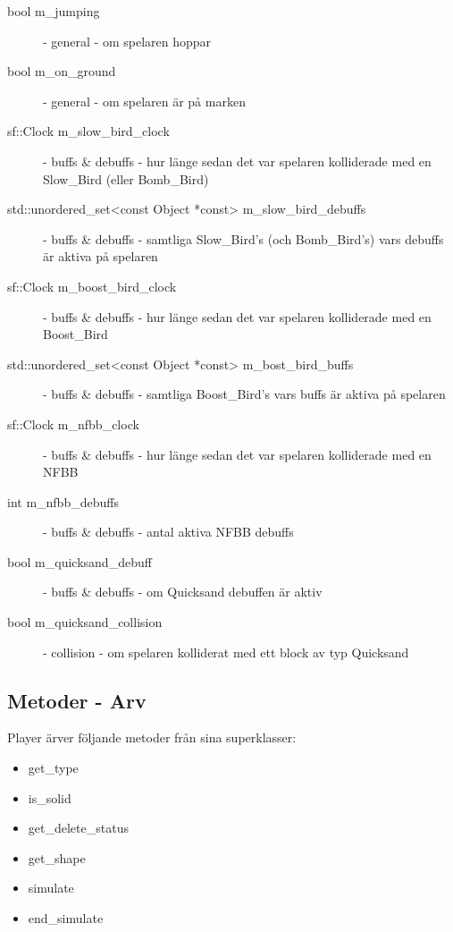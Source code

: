 \documentclass{TDP003mall}
\begin{document}
\begin{description}
\item[bool m\_jumping] - general - om spelaren hoppar
\item[bool m\_on\_ground] - general - om spelaren är på marken
\item[sf::Clock m\_slow\_bird\_clock] - buffs \& debuffs - hur länge sedan det var spelaren kolliderade med en Slow\_Bird (eller Bomb\_Bird)

\item[std::unordered\_set<const Object *const> m\_slow\_bird\_debuffs] - buffs \& debuffs - samtliga Slow\_Bird's (och Bomb\_Bird's) vars debuffs är aktiva på spelaren

\item[sf::Clock m\_boost\_bird\_clock] - buffs \& debuffs - hur länge sedan det var spelaren kolliderade med en Boost\_Bird

\item[std::unordered\_set<const Object *const> m\_bost\_bird\_buffs] - buffs \& debuffs - samtliga Boost\_Bird's vars buffs är aktiva på spelaren

\item[sf::Clock m\_nfbb\_clock] - buffs \& debuffs - hur länge sedan det var spelaren kolliderade med en NFBB

\item[int m\_nfbb\_debuffs] - buffs \& debuffs - antal aktiva NFBB debuffs

\item[bool m\_quicksand\_debuff] - buffs \& debuffs - om Quicksand debuffen är aktiv

\item[bool m\_quicksand\_collision] - collision - om spelaren kolliderat med ett block av typ Quicksand
\end{description}

\subsection{Metoder - Arv}
Player ärver följande metoder från sina superklasser:
\begin{itemize}
\item get\_type
\item is\_solid
\item get\_delete\_status
\item get\_shape
\item simulate
\item end\_simulate
\end{itemize}
\end{document}
